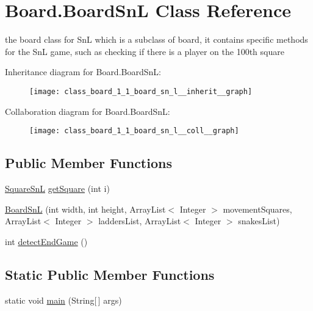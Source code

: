 \hypertarget{class_board_1_1_board_sn_l}{}\section{Board.\+Board\+Sn\+L Class Reference}
\label{class_board_1_1_board_sn_l}


the board class for Sn\+L which is a subclass of board, it contains specific methods for the Sn\+L game, such as checking if there is a player on the 100th square  




Inheritance diagram for Board.\+Board\+Sn\+L\+:
\nopagebreak
\begin{figure}[H]
\begin{center}
\leavevmode
\texttt{[image: class\_board\_1\_1\_board\_sn\_l\_\_inherit\_\_graph]}
\end{center}
\end{figure}


Collaboration diagram for Board.\+Board\+Sn\+L\+:
\nopagebreak
\begin{figure}[H]
\begin{center}
\leavevmode
\texttt{[image: class\_board\_1\_1\_board\_sn\_l\_\_coll\_\_graph]}
\end{center}
\end{figure}
\subsection*{Public Member Functions}
\begin{DoxyCompactItemize}
\item 
\hyperlink{class_square_1_1_square_sn_l}{Square\+Sn\+L} \hyperlink{class_board_1_1_board_sn_l_a808a8299c5ee4a8256b5e68915fd9eca}{get\+Square} (int i)
\item 
\hyperlink{class_board_1_1_board_sn_l_a03f7b8911496b68ad4de0d1b0939220a}{Board\+Sn\+L} (int width, int height, Array\+List$<$ Integer $>$ movement\+Squares, Array\+List$<$ Integer $>$ ladders\+List, Array\+List$<$ Integer $>$ snakes\+List)
\item 
int \hyperlink{class_board_1_1_board_sn_l_aae2b39e92ddf94fefa4bc86a3bdb6055}{detect\+End\+Game} ()
\end{DoxyCompactItemize}
\subsection*{Static Public Member Functions}
\begin{DoxyCompactItemize}
\item 
static void \hyperlink{class_board_1_1_board_sn_l_a528d4e87b3553f7c0bdb7b5a0a3685d5}{main} (String\mbox{[}$\,$\mbox{]} args)
\end{DoxyCompactItemize}
